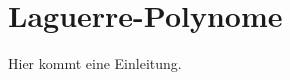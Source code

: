%
%
%
\chapter{Laguerre-Polynome\label{chapter:laguerre}}
\begin{refsection}

Hier kommt eine Einleitung.




% 
% 

\printbibliography[heading=subbibliography]
\end{refsection}
